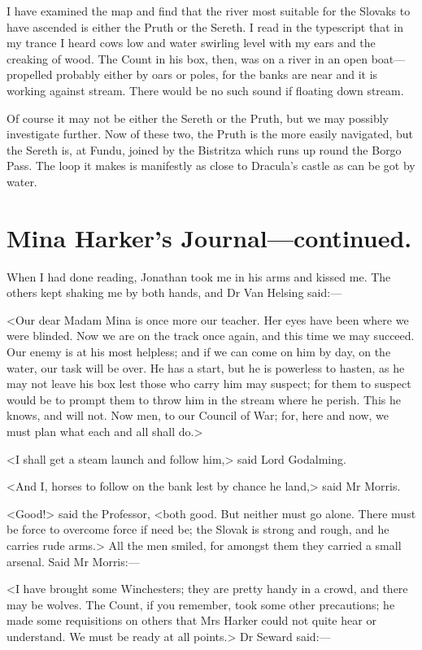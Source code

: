 I have examined the map and find that the river most suitable for the Slovaks to have ascended is either the Pruth or the Sereth. I read in the typescript that in my trance I heard cows low and water swirling level with my ears and the creaking of wood. The Count in his box, then, was on a river in an open boat—propelled probably either by oars or poles, for the banks are near and it is working against stream. There would be no such sound if floating down stream.

Of course it may not be either the Sereth or the Pruth, but we may possibly investigate further. Now of these two, the Pruth is the more easily navigated, but the Sereth is, at Fundu, joined by the Bistritza which runs up round the Borgo Pass. The loop it makes is manifestly as close to Dracula's castle as can be got by water.

\section{Mina Harker's Journal—continued.}

When I had done reading, Jonathan took me in his arms and kissed me. The others kept shaking me by both hands, and Dr Van Helsing said:—

<Our dear Madam Mina is once more our teacher. Her eyes have been where we were blinded. Now we are on the track once again, and this time we may succeed. Our enemy is at his most helpless; and if we can come on him by day, on the water, our task will be over. He has a start, but he is powerless to hasten, as he may not leave his box lest those who carry him may suspect; for them to suspect would be to prompt them to throw him in the stream where he perish. This he knows, and will not. Now men, to our Council of War; for, here and now, we must plan what each and all shall do.>

<I shall get a steam launch and follow him,> said Lord Godalming.

<And I, horses to follow on the bank lest by chance he land,> said Mr Morris.

<Good!> said the Professor, <both good. But neither must go alone. There must be force to overcome force if need be; the Slovak is strong and rough, and he carries rude arms.> All the men smiled, for amongst them they carried a small arsenal. Said Mr Morris:—

<I have brought some Winchesters; they are pretty handy in a crowd, and there may be wolves. The Count, if you remember, took some other precautions; he made some requisitions on others that Mrs Harker could not quite hear or understand. We must be ready at all points.> Dr Seward said:—

